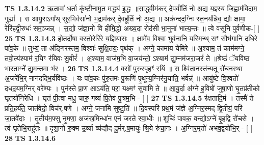\documentclass[17pt]{extarticle}
\begin{document}
                  \newline
                                \textbf{ TS 1.3.14.2} \newline
                  ऋ॒तावा॑ ध॒र्ता कृ॑ष्टी॒नामु॒त मद्ध्य॑ इ॒द्धः ॥सा॒द्ध्वीम॑कर् दे॒ववी॑तिं नो अ॒द्य य॒ज्ञ्स्य॑ जि॒ह्वाम॑विदाम॒ गुह्यां᳚ । स आयु॒राऽगा᳚थ् सुर॒भिर्वसा॑नो भ॒द्राम॑कर् दे॒वहू॑तिं नो अ॒द्य ॥ अक्र॑न्दद॒ग्निः स्त॒नय॑न्निव॒ द्यौः क्षामा॒ रेरि॑हद्वी॒रुधः॑ सम॒ञ्जन्न् । स॒द्यो ज॑ज्ञा॒नो वि हीमि॒द्धो अख्य॒दा रोद॑सी भा॒नुना॑ भात्य॒न्तः ॥ त्वे वसू॑नि पुर्वणीक-[ ] \textbf{  25} \newline
                  \newline
                                \textbf{ TS 1.3.14.3} \newline
                  होतर्दो॒षा वस्तो॒रेरि॑रे य॒ज्ञिया॑सः । क्षामे॑व॒ विश्वा॒ भुव॑नानि॒ यस्मि॒न्थ् सꣳ सौभ॑गानि दधि॒रे पा॑व॒के ॥ तुभ्यं॒ ता अ॑ङ्गिरस्तम॒ विश्वाः᳚ सुक्षि॒तयः॒ पृथ॑क् । अग्ने॒ कामा॑य येमिरे ॥ अ॒श्याम॒ तं काम॑मग्ने॒ तवो॒त्य॑श्याम॑ र॒यिꣳ र॑यिवः सु॒वीरं᳚ । अ॒श्याम॒ वाज॑म॒भि वा॒जय॑न्तो॒ ऽश्याम॑ द्यु॒म्नम॑जरा॒जरं॑ ते ॥श्रेष्ठं॑ ॅयविष्ठ भार॒ताग्ने᳚ द्यु॒मन्त॒मा भ॑र । \textbf{  26} \newline
                  \newline
                                \textbf{ TS 1.3.14.4} \newline
                  वसो॑ पुरु॒स्पृहꣳ॑ र॒यिं ॥ स श्वि॑ता॒नस्त॑न्य॒तू रो॑चन॒स्था अ॒जरे॑भि॒र् नान॑दद्भि॒र्यवि॑ष्ठः । यः पा॑व॒कः पु॑रु॒तमः॑ पु॒रूणि॑ पृ॒थून्य॒ग्निर॑नु॒याति॒ भर्वन्न्॑ ॥ आयु॑ष्टे वि॒श्वतो॑ दधद॒यम॒ग्निर् वरे᳚ण्यः । पुन॑स्ते प्रा॒ण आऽय॑ति॒ परा॒ यक्ष्मꣳ॑ सुवामि ते ॥ आ॒यु॒र्दा अ॑ग्ने ह॒विषो॑ जुषा॒णो घृ॒तप्र॑तीको घृ॒तयो॑निरेधि । घृ॒तं पी॒त्वा मधु॒ चारु॒ गव्यं॑ पि॒तेव॑ पु॒त्रम॒भि - [ ] \textbf{  27} \newline
                  \newline
                                \textbf{ TS 1.3.14.5} \newline
                  र॑क्षतादि॒मं । तस्मै॑ ते प्रति॒हर्य॑ते॒ जात॑वेदो॒ विच॑र्.षणे । अग्ने॒ जना॑मि सुष्टु॒तिं ॥ दि॒वस्परि॑ प्रथ॒मं ज॑ज्ञे अ॒ग्निर॒स्मद् द्वि॒तीयं॒ परि॑ जा॒तवे॑दाः । तृ॒तीय॑म॒फ्सु नृ॒मणा॒ अज॑स्र॒मिन्धा॑न एनं जरते स्वा॒धीः ॥ शुचिः॑ पावक॒ वन्द्योऽग्ने॑ बृ॒हद्वि रो॑चसे । त्वं घृ॒तेभि॒राहु॑तः ॥ दृ॒शा॒नो रु॒क्म उ॒र्व्या व्य॑द्यौद्-दु॒र्मर्.ष॒मायुः॑ श्रि॒ये रु॑चा॒नः । अ॒ग्निर॒मृतो॑ अभव॒द्वयो॑भि॒र् - [ ] \textbf{  28} \newline
                  \newline
                                \textbf{ TS 1.3.14.6} \newline
\end{document}
